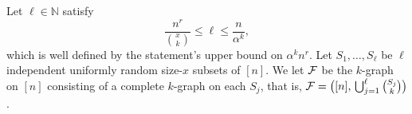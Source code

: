 \documentclass[11pt]{article}
\makeatletter
\renewenvironment{proof}[1][\proofname]
{\par\pushQED{\qed}
	\normalfont\topsep6\p@\@plus6\p@\relax\trivlist
	\item[\hskip\labelsep\bfseries#1\@addpunct{.}]
	\ignorespaces}
{\popQED\endtrivlist\@endpefalse}
\newcommand{\FF}{{\cal F}}
\renewcommand{\a}{\alpha}
\newcommand{\N}{\mathbb{N}}
\makeatother
\begin{document}
\begin{proof}[Proof of Theorem~\ref{theo:sKK-UB}]
	Let $\ell \in \N$ satisfy
	\begin{equation}\label{eq:UB-identity-KK}
	\frac{n^r}{\binom{x}{k}} \le \ell \le \frac{n}{\a^k},
	\end{equation}
	which is well defined by the statement's upper bound on $\a^k n^r$.
	Let $S_1,\ldots,S_\ell$ be $\ell$ independent uniformly random size-$x$ subsets of $[n]$.
	We let $\FF$ be the $k$-graph on $[n]$ consisting of a complete $k$-graph on each $S_j$, that is, $\FF = \big([n],\,\bigcup_{j=1}^\ell \binom{S_j}{k}\big)$.
	

\end{proof}
\end{document}
